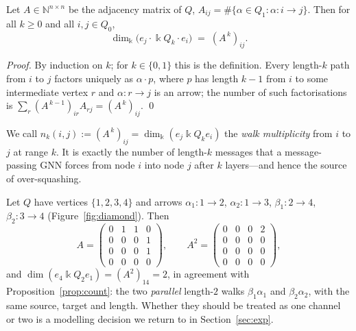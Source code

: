 \documentclass[runningheads]{llncs}
\newcommand{\kk}{\Bbbk}
\newcommand{\kQ}{\kk Q}
\newcommand{\NN}{\mathbb{N}}
\newcommand{\Adj}{A}
\begin{document}
\begin{proposition}\label{prop:count}
Let $\Adj\in\NN^{n\times n}$ be the adjacency matrix of $Q$,
$\Adj_{ij}=\#\{\alpha\in Q_1:\alpha\colon i\to j\}$. Then for all $k\ge0$ and
all $i,j\in Q_0$,
\[
  \dim_{\kk}\bigl(e_j\cdot \kQ_k\cdot e_i\bigr) \;=\; (\Adj^{\,k})_{ij}.
\]
\end{proposition}

\begin{proof}
By induction on $k$; for $k\in\{0,1\}$ this is the definition. Every length-$k$
path from $i$ to $j$ factors uniquely as $\alpha\cdot p$, where $p$ has length
$k-1$ from $i$ to some intermediate vertex $r$ and $\alpha\colon r\to j$ is an
arrow; the number of such factorisations is
$\sum_r(\Adj^{\,k-1})_{ir}\Adj_{rj}=(\Adj^{\,k})_{ij}$. \qed
\end{proof}

We call $n_k(i,j):=(\Adj^{\,k})_{ij}=\dim_\kk(e_j\kQ_k e_i)$ the \emph{walk
multiplicity} from $i$ to $j$ at range $k$. It is exactly the number of
length-$k$ messages that a message-passing GNN forces from node $i$ into node
$j$ after $k$ layers---and hence the source of over-squashing.

\begin{example}\label{ex:diamond}
Let $Q$ have vertices $\{1,2,3,4\}$ and arrows $\alpha_1\colon1\to2$,
$\alpha_2\colon1\to3$, $\beta_1\colon2\to4$, $\beta_2\colon3\to4$
(Figure~\ref{fig:diamond}). Then
\[
  \Adj=\begin{pmatrix}0&1&1&0\\0&0&0&1\\0&0&0&1\\0&0&0&0\end{pmatrix},
  \qquad
  \Adj^2=\begin{pmatrix}0&0&0&2\\0&0&0&0\\0&0&0&0\\0&0&0&0\end{pmatrix},
\]
and $\dim(e_4\kQ_2e_1)=(\Adj^2)_{14}=2$, in agreement with
Proposition~\ref{prop:count}: the two \emph{parallel} length-$2$ walks
$\beta_1\alpha_1$ and $\beta_2\alpha_2$, with the same source, target and
length. Whether they should be treated as one channel or two is a modelling
decision we return to in Section~\ref{sec:exp}.
\end{example}
\end{document}

